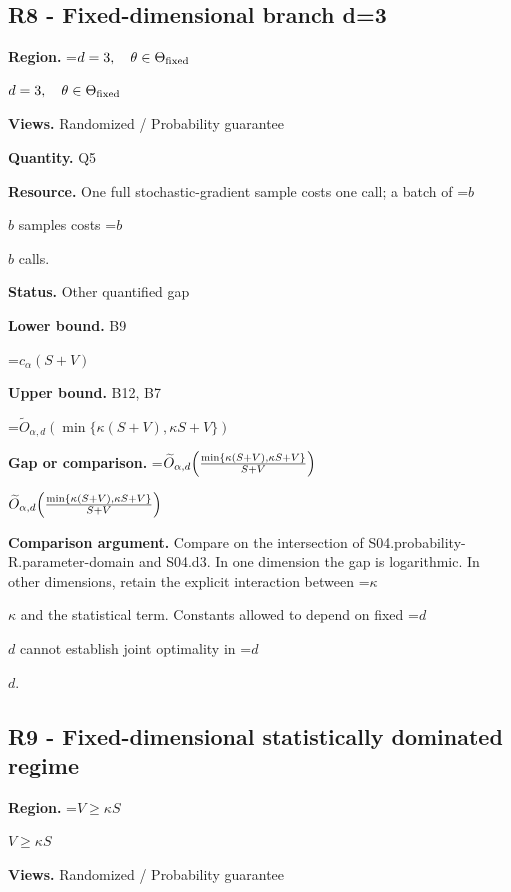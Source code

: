 \documentclass[10pt,a4paper]{article}
\newcommand{\AtlasMath}[1]{\par\begingroup\centering\setbox0=\hbox{$\displaystyle #1$}\ifdim\wd0>1.4\linewidth\typeout{ATLAS WIDE FORMULA: \the\wd0}\fi\ifdim\wd0>\linewidth\resizebox{\linewidth}{!}{\box0}\else\box0\fi\par\endgroup}
\newcommand{\AtlasInlineMath}[1]{\begingroup\setbox0=\hbox{$#1$}\ifdim\wd0>.4\linewidth\endgroup\AtlasMath{#1}\else\endgroup$#1$\fi}
\begin{document}
\subsection{R8 - Fixed-dimensional branch d=3}


\textbf{Region.} \AtlasInlineMath{d=3,\quad\theta\in\Theta_{\rm fixed}}



\textbf{Views.} Randomized / Probability guarantee



\textbf{Quantity.} Q5



\textbf{Resource.} One full stochastic-gradient sample costs one call; a batch of \AtlasInlineMath{b} samples costs \AtlasInlineMath{b} calls.



\textbf{Status.} Other quantified gap



\textbf{Lower bound.} B9



\AtlasMath{c_\alpha(S+V)}


\textbf{Upper bound.} B12, B7



\AtlasMath{\widetilde{O}_{\alpha,d}(\min\{\kappa(S+V),\kappa S+V\})}


\textbf{Gap or comparison.} \AtlasInlineMath{\widetilde{O}_{\alpha,d}\!\left({\min\{\kappa(S+V),\kappa S+V\}\over S+V}\right)}



\textbf{Comparison argument.} Compare on the intersection of S04.probability-R.parameter-domain and S04.d3. In one dimension the gap is logarithmic. In other dimensions, retain the explicit interaction between \AtlasInlineMath{\kappa} and the statistical term. Constants allowed to depend on fixed \AtlasInlineMath{d} cannot establish joint optimality in \AtlasInlineMath{d}.



\subsection{R9 - Fixed-dimensional statistically dominated regime}


\textbf{Region.} \AtlasInlineMath{V\ge \kappa S}



\textbf{Views.} Randomized / Probability guarantee
\end{document}
